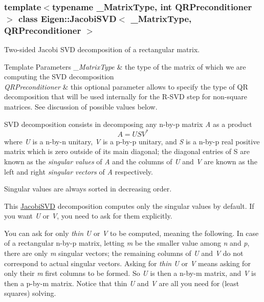 \subsubsection*{template$<$typename \+\_\+\+Matrix\+Type, int Q\+R\+Preconditioner$>$\newline
class Eigen\+::\+Jacobi\+S\+V\+D$<$ \+\_\+\+Matrix\+Type, Q\+R\+Preconditioner $>$}

Two-\/sided Jacobi S\+VD decomposition of a rectangular matrix. 


\begin{DoxyTemplParams}{Template Parameters}
{\em \+\_\+\+Matrix\+Type} & the type of the matrix of which we are computing the S\+VD decomposition \\
\hline
{\em Q\+R\+Preconditioner} & this optional parameter allows to specify the type of QR decomposition that will be used internally for the R-\/\+S\+VD step for non-\/square matrices. See discussion of possible values below.\\
\hline
\end{DoxyTemplParams}
S\+VD decomposition consists in decomposing any n-\/by-\/p matrix {\itshape A} as a product \[ A = U S V^* \] where {\itshape U} is a n-\/by-\/n unitary, {\itshape V} is a p-\/by-\/p unitary, and {\itshape S} is a n-\/by-\/p real positive matrix which is zero outside of its main diagonal; the diagonal entries of S are known as the {\itshape singular} {\itshape values} of {\itshape A} and the columns of {\itshape U} and {\itshape V} are known as the left and right {\itshape singular} {\itshape vectors} of {\itshape A} respectively.

Singular values are always sorted in decreasing order.

This \mbox{\hyperlink{class_eigen_1_1_jacobi_s_v_d}{Jacobi\+S\+VD}} decomposition computes only the singular values by default. If you want {\itshape U} or {\itshape V}, you need to ask for them explicitly.

You can ask for only {\itshape thin} {\itshape U} or {\itshape V} to be computed, meaning the following. In case of a rectangular n-\/by-\/p matrix, letting {\itshape m} be the smaller value among {\itshape n} and {\itshape p}, there are only {\itshape m} singular vectors; the remaining columns of {\itshape U} and {\itshape V} do not correspond to actual singular vectors. Asking for {\itshape thin} {\itshape U} or {\itshape V} means asking for only their {\itshape m} first columns to be formed. So {\itshape U} is then a n-\/by-\/m matrix, and {\itshape V} is then a p-\/by-\/m matrix. Notice that thin {\itshape U} and {\itshape V} are all you need for (least squares) solving.

